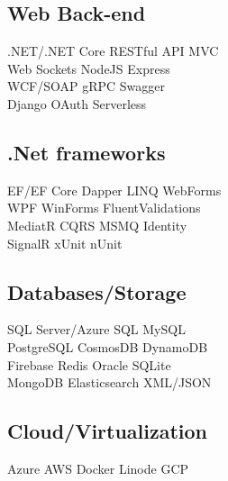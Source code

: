 \documentclass[letterpaper]{cv_12} %
\begin{document}
\begin{minipage}[t]{0.33\textwidth}
\sectionspace%

\subsection{Web Back-end}

.NET/.NET Core \textbullet{} RESTful API \textbullet{} MVC\\
Web Sockets \textbullet{} NodeJS \textbullet{} Express\\
WCF/SOAP \textbullet{} gRPC \textbullet{} Swagger\\
Django \textbullet{} OAuth \textbullet{} Serverless

\sectionspace%

\subsection{.Net frameworks}

EF/EF Core \textbullet{} Dapper \textbullet{} LINQ \textbullet{} WebForms\\
WPF \textbullet{} WinForms \textbullet{} FluentValidations\\
MediatR \textbullet{} CQRS \textbullet{} MSMQ \textbullet{} Identity\\
SignalR \textbullet{} xUnit \textbullet{} nUnit

\sectionspace%

\subsection{Databases/Storage}

SQL Server/Azure SQL \textbullet{} MySQL\\ 
PostgreSQL \textbullet{} CosmosDB \textbullet{} DynamoDB\\
Firebase \textbullet{} Redis \textbullet{} Oracle \textbullet{} SQLite\\
MongoDB \textbullet{} Elasticsearch \textbullet{} XML/JSON

\sectionspace%

\subsection{Cloud/Virtualization}

Azure \textbullet{} AWS \textbullet{} Docker \textbullet{} Linode \textbullet{} GCP


\end{minipage}
\end{document}
